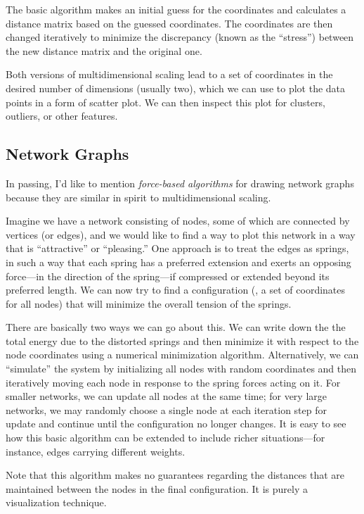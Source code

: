 The basic algorithm makes an initial guess for the coordinates and
calculates a distance matrix based on the guessed coordinates.  The
coordinates are then changed iteratively to minimize the discrepancy
(known as the ``stress'') between the new distance matrix and the
original one.

Both versions of multidimensional scaling lead to a set of coordinates
in the desired number of dimensions (usually two), which we can use to
plot the data points in a form of scatter plot. We can then inspect
this plot for clusters, outliers, or other features.

\vspace*{-6pt}
\subsection{Network Graphs}

 
In passing, I'd like to mention \emph{force-based algorithms}
 for drawing network graphs because they
are similar in spirit to multidimensional scaling.

Imagine we have a network consisting of nodes, some of which are
connected by vertices (or edges), and we would like to find a way to
plot this network in a way that is ``attractive'' or ``pleasing.''
One approach is to treat the edges as springs, in such a way that each
spring has a preferred extension and exerts an opposing force---in the
direction of the spring---if compressed or extended beyond its
preferred length. We can now try to find a configuration (\ie, a set
of coordinates for all nodes) that will minimize the overall tension
of the springs.

There are basically two ways we can go about this. We can write down
the the total energy due to the distorted springs and then minimize it
with respect to the node coordinates using a numerical minimization
algorithm. Alternatively, we can ``simulate'' the system by
initializing all nodes with random coordinates and then iteratively
moving each node in response to the spring forces acting on it. For
smaller networks, we can update all nodes at the same time; for very
large networks, we may randomly choose a single node at each iteration
step for update and continue until the configuration no longer
changes. It is easy to see how this basic algorithm can be extended
to include richer situations---for instance, edges carrying different
weights.

Note that this algorithm makes no guarantees regarding the distances
that are maintained between the nodes in the final configuration. It
is purely a visualization technique.

